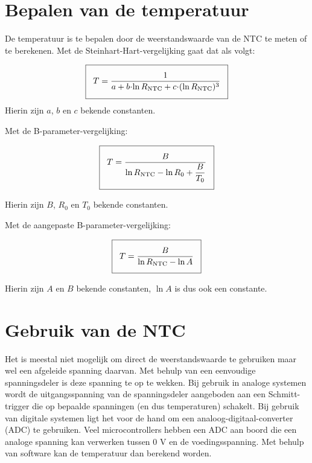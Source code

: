 \documentclass[12pt,a4paper,final,twoside,fleqn]{article}
\newcommand{\rntc}{R_\text{NTC}}
\let\oldcdot\cdot
\renewcommand{\cdot}{\kern-.10em\oldcdot\kern-.10em}
\begin{document}
\clearpage
\section{Bepalen van de temperatuur}
\label{sec:bepalentemperatuur}
De temperatuur is te bepalen door de weerstandswaarde van de NTC te meten of te
berekenen.
Met de Steinhart-Hart-vergelijking gaat dat als volgt:

\begin{equation}
\label{equ:invertedsteinharthart}
\setlength\fboxsep{2ex}
\boxed{T = \dfrac{1}{a + b\cdot\ln \rntc + c\cdot( \ln \rntc )^3}}
\end{equation}
Hierin zijn $a$, $b$ en $c$ bekende constanten.

Met de B-parameter-vergelijking:

\begin{equation}
\label{equ:invertedsteinharthartsimpl}
\setlength\fboxsep{2ex}
\boxed{T = \dfrac{B}{\ln \rntc - \ln R_0 + \dfrac{B}{T_0}}}
\end{equation}

Hierin zijn $B$, $R_0$ en $T_0$ bekende constanten.


Met de aangepaste B-parameter-vergelijking:

\begin{equation}
\label{equ:invertedsteinharthartadapt}
\setlength\fboxsep{2ex}
\boxed{T = \dfrac{B}{\ln \rntc - \ln A}}
\end{equation}

Hierin zijn $A$ en $B$ bekende constanten, $\ln A$ is dus ook een constante.


\clearpage
\section{Gebruik van de NTC}
\label{sec:gebruik}
Het is meestal niet mogelijk om direct de weerstandswaarde te gebruiken maar
wel een afgeleide spanning daarvan. Met behulp van een eenvoudige spanningsdeler
is deze spanning te op te wekken. Bij gebruik in analoge systemen wordt de
uitgangsspanning van de spanningsdeler aangeboden aan een Schmitt-trigger die op
bepaalde spanningen (en dus temperaturen) schakelt.
Bij gebruik van digitale systemen ligt het voor de hand
om een analoog-digitaal-converter (ADC) te gebruiken. Veel microcontrollers hebben
een ADC aan boord die een analoge spanning kan verwerken tussen 0 V en de
voedingsspanning. Met behulp van software kan de temperatuur dan berekend worden.
\end{document}
